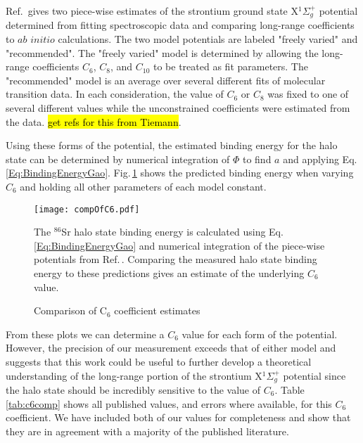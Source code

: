 Ref.\,\hl{\cite{Stein2010}} gives two piece-wise estimates of the strontium ground state X$^1\Sigma_g^+$ potential determined from fitting spectroscopic data and comparing long-range coefficients to $\textit{ab initio}$ calculations.
The two model potentials are labeled "freely varied" and "recommended".
The "freely varied" model is determined by allowing the long-range coefficients $C_6$, $C_8$, and $C_{10}$ to be treated as fit parameters.
The "recommended" model is an average over several different fits of molecular transition data.
In each consideration, the value of $C_6$ or $C_8$ was fixed to one of several different values while the unconstrained coefficients were estimated from the data. \hl{get refs for this from Tiemann}.

Using these forms of the potential, the estimated binding energy for the halo state can be determined by numerical integration of $\Phi$ to find $a$ and applying Eq.\,\ref{Eq:BindingEnergyGao}.
Fig.\,\ref{fig:c6estimates} shows the predicted binding energy when varying $C_6$ and holding all other parameters of each model constant.
	\begin{figure} 
	\centerline{
	  \texttt{[image: compOfC6.pdf]}}
	  \caption{Comparison of C$_6$ coefficient estimates}{The $^{86}$Sr halo state binding energy is calculated using Eq.\,\ref{Eq:BindingEnergyGao} and numerical integration of the piece-wise potentials from Ref.\,\hl{\cite{Stein2010}}. Comparing the measured halo state binding energy to these predictions gives an estimate of the underlying $C_6$ value.}
	  \label{fig:c6estimates}
	\end{figure}
From these plots we can determine a $C_6$ value for each form of the potential.
However, the precision of our measurement exceeds that of either model and suggests that this work could be useful to further develop a theoretical understanding of the long-range portion of the strontium X$^1\Sigma_g^+$ potential since the halo state should be incredibly sensitive to the value of $C_6$.
Table \ref{tab:c6comp} shows all published values, and errors where available, for this $C_6$ coefficient.
We have included both of our values for completeness and show that they are in agreement with a majority of the published literature.
